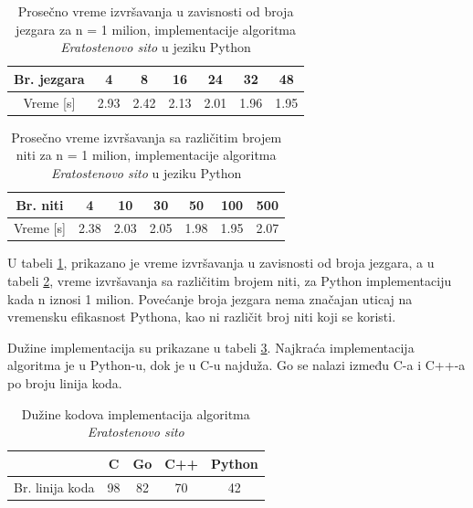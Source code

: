 \documentclass[12pt,oneside]{memoir}
\begin{document}
\begin{table}[H]
\begin{center}
\caption{Prosečno vreme izvršavanja  u zavisnosti od broja jezgara za n = 1 milion, implementacije algoritma \textit{Eratostenovo sito} u jeziku Python}
\begin{tabular}{||c||c|c|c|c|c|c||}
\hline
Br. jezgara &4  &8 &16 &24 & 32 &48 \\ \hline
Vreme [s]	&2.93		&2.42		&2.13 	& 2.01	&1.96 	&1.95\\ \hline  
\end{tabular}
\label{tab:prime11}
\end{center}
\end{table}

\begin{table}[H]
\begin{center}
\caption{Prosečno vreme izvršavanja  sa različitim brojem niti za n = 1 milion, implementacije algoritma \textit{Eratostenovo sito} u jeziku Python}
\begin{tabular}{||c||c|c|c|c|c|c||}
\hline
Br. niti &4 &10 &30 &50 &100 & 500  \\ \hline
Vreme [s]	&2.38		&2.03		&2.05	 	& 1.98	&1.95		&2.07\\ \hline
\end{tabular}
\label{tab:prime111}
\end{center}
\end{table}

U  tabeli \ref{tab:prime11}, prikazano je vreme izvršavanja u zavisnosti od broja jezgara, a u tabeli \ref{tab:prime111}, vreme izvršavanja sa različitim brojem niti, za Python implementaciju kada n iznosi 1 milion. Povećanje broja jezgara nema značajan uticaj na vremensku efikasnost Pythona, kao ni različit broj niti koji se koristi.

Dužine implementacija su prikazane u tabeli \ref{tab:prime2}. Najkraća implementacija algoritma je u Python-u, dok je u C-u najduža. Go se nalazi između C-a i C++-a po broju linija koda.

\begin{table}[H]
\begin{center}
\caption{Dužine kodova implementacija algoritma \textit{Eratostenovo sito}}
\begin{tabular}{|c|c|c|c|c|}
\hline
		&  C  		&Go 	& C++ & Python 	 \\ \hline
Br. linija koda&98		& 82	&70	&42		 \\ \hline
\end{tabular}
\label{tab:prime2}
\end{center}
\end{table}
\end{document}

